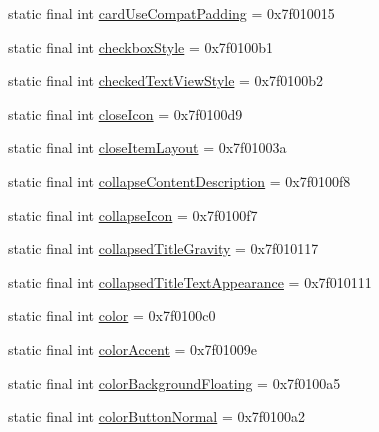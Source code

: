 \begin{CompactItemize}
\item 
static final int \hyperlink{classandroid_1_1support_1_1graphics_1_1drawable_1_1_r_1_1attr_37d1a1073e436afe463c3f31105a3f99}{cardUseCompatPadding} = 0x7f010015
\item 
static final int \hyperlink{classandroid_1_1support_1_1graphics_1_1drawable_1_1_r_1_1attr_e302941c85acc46cacc390f274386562}{checkboxStyle} = 0x7f0100b1
\item 
static final int \hyperlink{classandroid_1_1support_1_1graphics_1_1drawable_1_1_r_1_1attr_aa9e2c0a00abba70b5a5348b6ecd32f7}{checkedTextViewStyle} = 0x7f0100b2
\item 
static final int \hyperlink{classandroid_1_1support_1_1graphics_1_1drawable_1_1_r_1_1attr_83548829fa96b41f5e13efab7854bab3}{closeIcon} = 0x7f0100d9
\item 
static final int \hyperlink{classandroid_1_1support_1_1graphics_1_1drawable_1_1_r_1_1attr_08717f6a998c33ef0486805422e3490d}{closeItemLayout} = 0x7f01003a
\item 
static final int \hyperlink{classandroid_1_1support_1_1graphics_1_1drawable_1_1_r_1_1attr_9ba49a22518bcd25cdc882f626fc6f02}{collapseContentDescription} = 0x7f0100f8
\item 
static final int \hyperlink{classandroid_1_1support_1_1graphics_1_1drawable_1_1_r_1_1attr_b8ebe4796212f4517938b0d4e8825e40}{collapseIcon} = 0x7f0100f7
\item 
static final int \hyperlink{classandroid_1_1support_1_1graphics_1_1drawable_1_1_r_1_1attr_ac39a7943c3a576e78ce4f2e903e8a86}{collapsedTitleGravity} = 0x7f010117
\item 
static final int \hyperlink{classandroid_1_1support_1_1graphics_1_1drawable_1_1_r_1_1attr_cfa328445b23e67c53ea67f04c3895ce}{collapsedTitleTextAppearance} = 0x7f010111
\item 
static final int \hyperlink{classandroid_1_1support_1_1graphics_1_1drawable_1_1_r_1_1attr_03f87debdfd794f7a7b906afda7614a1}{color} = 0x7f0100c0
\item 
static final int \hyperlink{classandroid_1_1support_1_1graphics_1_1drawable_1_1_r_1_1attr_c8abb6c6b54aa9c1410a312291f7aa24}{colorAccent} = 0x7f01009e
\item 
static final int \hyperlink{classandroid_1_1support_1_1graphics_1_1drawable_1_1_r_1_1attr_0377d36ce4189f7c4129537db713ce89}{colorBackgroundFloating} = 0x7f0100a5
\item 
static final int \hyperlink{classandroid_1_1support_1_1graphics_1_1drawable_1_1_r_1_1attr_bc7e2061713883bbee5a4d651a63cb81}{colorButtonNormal} = 0x7f0100a2

\end{CompactItemize}
